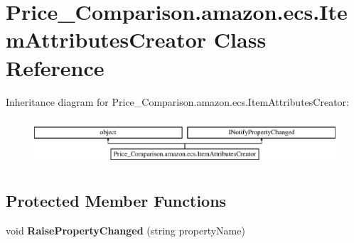 \hypertarget{class_price___comparison_1_1amazon_1_1ecs_1_1_item_attributes_creator}{\section{Price\-\_\-\-Comparison.\-amazon.\-ecs.\-Item\-Attributes\-Creator Class Reference}
\label{class_price___comparison_1_1amazon_1_1ecs_1_1_item_attributes_creator}
}


 


Inheritance diagram for Price\-\_\-\-Comparison.\-amazon.\-ecs.\-Item\-Attributes\-Creator\-:\begin{figure}[H]
\begin{center}
\leavevmode
\includegraphics[height=1.766562cm]{class_price___comparison_1_1amazon_1_1ecs_1_1_item_attributes_creator}
\end{center}
\end{figure}
\subsection*{Protected Member Functions}
\begin{DoxyCompactItemize}
\item 
\hypertarget{class_price___comparison_1_1amazon_1_1ecs_1_1_item_attributes_creator_a3a8dcc426aa441e417b15d34694e1b56}{void {\bfseries Raise\-Property\-Changed} (string property\-Name)}\label{class_price___comparison_1_1amazon_1_1ecs_1_1_item_attributes_creator_a3a8dcc426aa441e417b15d34694e1b56}

\end{DoxyCompactItemize}
